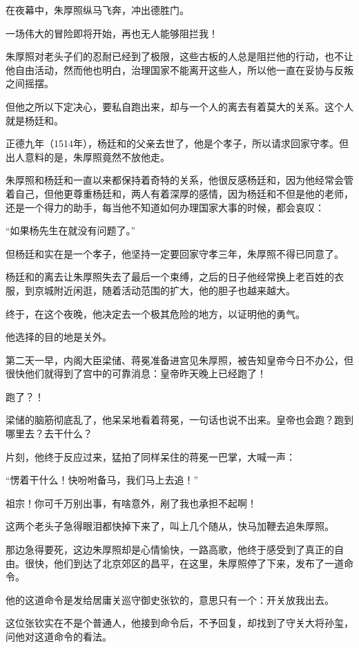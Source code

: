 \begin{multicols}{\theparacolNo}
		在夜幕中，朱厚照纵马飞奔，冲出德胜门。

		一场伟大的冒险即将开始，再也无人能够阻拦我！

		朱厚照对老头子们的忍耐已经到了极限，这些古板的人总是阻拦他的行动，也不让他自由活动，然而他也明白，治理国家不能离开这些人，所以他一直在妥协与反叛之间摇摆。

		但他之所以下定决心，要私自跑出来，却与一个人的离去有着莫大的关系。这个人就是杨廷和。

		正德九年（1514年），杨廷和的父亲去世了，他是个孝子，所以请求回家守孝。但出人意料的是，朱厚照竟然不放他走。

		朱厚照和杨廷和一直以来都保持着奇特的关系，他很反感杨廷和，因为他经常会管着自己，但他更尊重杨廷和，两人有着深厚的感情，因为杨廷和不但是他的老师，还是一个得力的助手，每当他不知道如何办理国家大事的时候，都会哀叹：

		“如果杨先生在就没有问题了。”

		但杨廷和实在是一个孝子，他坚持一定要回家守孝三年，朱厚照不得已同意了。

		杨廷和的离去让朱厚照失去了最后一个束缚，之后的日子他经常换上老百姓的衣服，到京城附近闲逛，随着活动范围的扩大，他的胆子也越来越大。

		终于，在这个夜晚，他决定去一个极其危险的地方，以证明他的勇气。

		他选择的目的地是关外。

		第二天一早，内阁大臣梁储、蒋冕准备进宫见朱厚照，被告知皇帝今日不办公，但很快他们就得到了宫中的可靠消息：皇帝昨天晚上已经跑了！

		跑了？！

		梁储的脑筋彻底乱了，他呆呆地看着蒋冕，一句话也说不出来。皇帝也会跑？跑到哪里去？去干什么？

		片刻，他终于反应过来，猛拍了同样呆住的蒋冕一巴掌，大喊一声：

		“愣着干什么！快吩咐备马，我们马上去追！”

		祖宗！你可千万别出事，有啥意外，剐了我也承担不起啊！

		这两个老头子急得眼泪都快掉下来了，叫上几个随从，快马加鞭去追朱厚照。

		那边急得要死，这边朱厚照却是心情愉快，一路高歌，他终于感受到了真正的自由。很快，他们到达了北京郊区的昌平，在这里，朱厚照停了下来，发布了一道命令。

		他的这道命令是发给居庸关巡守御史张钦的，意思只有一个：开关放我出去。

		这位张钦实在不是个普通人，他接到命令后，不予回复，却找到了守关大将孙玺，问他对这道命令的看法。


\end{multicols}
